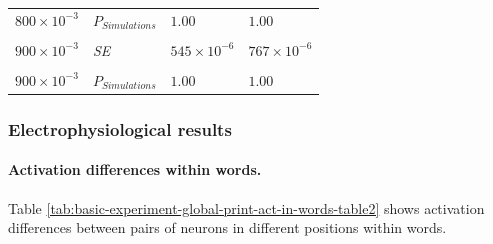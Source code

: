 \documentclass[
]{article}
\begin{document}
\begin{longtable}[t]{llll}
${800}\times 10^{-3}$ & $P_{Simulations}$ & $1.00$ & $1.00$\\
\cellcolor{gray!6}{${900}\times 10^{-3}$} & \cellcolor{gray!6}{{\em M}} & \cellcolor{gray!6}{${5.42}\times 10^{-3}$} & \cellcolor{gray!6}{${7.63}\times 10^{-3}$}\\
${900}\times 10^{-3}$ & {\em SE} & ${545}\times 10^{-6}$ & ${767}\times 10^{-6}$\\
\cellcolor{gray!6}{${900}\times 10^{-3}$} & \cellcolor{gray!6}{$p_{Wilcoxon}$} & \cellcolor{gray!6}{${3.96}\times 10^{-18}$} & \cellcolor{gray!6}{${3.96}\times 10^{-18}$}\\
\addlinespace
${900}\times 10^{-3}$ & $P_{Simulations}$ & $1.00$ & $1.00$\\*
\end{longtable}

\clearpage

\hypertarget{electrophysiological-results-1}{%
\subsubsection{Electrophysiological
results}\label{electrophysiological-results-1}}

\hypertarget{activation-differences-within-words.}{%
\paragraph{Activation differences within
words.}\label{activation-differences-within-words.}}

Table \ref{tab:basic-experiment-global-print-act-in-words-table2} shows
activation differences between pairs of neurons in different positions
within words.
\end{document}
